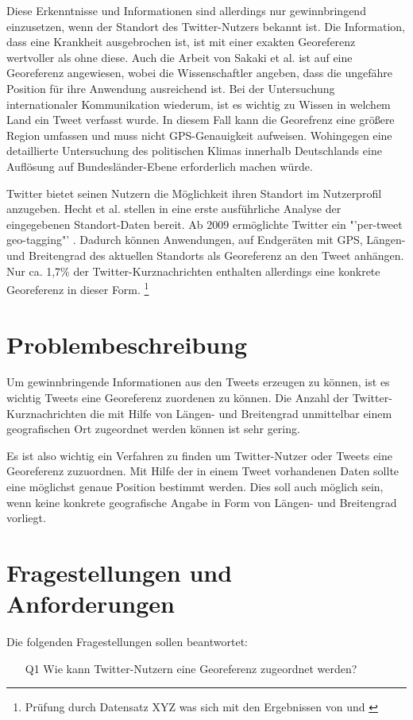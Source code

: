 		Diese Erkenntnisse und Informationen sind allerdings nur gewinnbringend einzusetzen, wenn der Standort des Twitter-Nutzers bekannt ist. 
		Die Information, dass eine Krankheit ausgebrochen ist, ist mit einer exakten Georeferenz wertvoller als ohne diese. 
		Auch die Arbeit von Sakaki et al. ist auf eine Georeferenz angewiesen, wobei die Wissenschaftler angeben, dass die ungefähre Position für ihre Anwendung ausreichend ist.
		Bei der Untersuchung internationaler Kommunikation wiederum, ist es wichtig zu Wissen in welchem Land ein Tweet verfasst wurde.
		In diesem Fall kann die Georefrenz eine größere Region umfassen und muss nicht GPS-Genauigkeit aufweisen.  
		Wohingegen eine detaillierte Untersuchung des politischen Klimas innerhalb Deutschlands eine Auflösung auf Bundesländer-Ebene erforderlich machen würde. 

 		Twitter bietet seinen Nutzern die Möglichkeit ihren Standort im Nutzerprofil anzugeben. 
 		Hecht et al. stellen in \cite{Hecht2011} eine erste ausführliche Analyse der eingegebenen Standort-Daten bereit.  
 		Ab 2009 ermöglichte Twitter ein "'per-tweet geo-tagging"' \cite{Cheng2010}.
 		Dadurch können Anwendungen, auf Endgeräten mit GPS, Längen- und Breitengrad des aktuellen Standorts als Georeferenz an den Tweet anhängen.    
		Nur ca. 1,7\% der Twitter-Kurznachrichten enthalten allerdings eine konkrete Georeferenz in dieser Form. \footnote{Prüfung durch Datensatz XYZ was sich mit den Ergebnissen von \cite{Priedhorsky2013} und \cite{Schulz2013}}


	\section{Problembeschreibung} 
		Um gewinnbringende Informationen aus den Tweets erzeugen zu können, ist es wichtig Tweets eine Georeferenz zuordenen zu können.
		Die Anzahl der Twitter-Kurznachrichten die mit Hilfe von Längen- und Breitengrad unmittelbar einem geografischen Ort zugeordnet werden können ist sehr gering. 
		
		Es ist also wichtig ein Verfahren zu finden um Twitter-Nutzer oder Tweets eine Georeferenz zuzuordnen. 
		Mit Hilfe der in einem Tweet vorhandenen Daten sollte eine möglichst genaue Position bestimmt werden. 
		Dies soll auch möglich sein, wenn keine konkrete geografische Angabe in Form von Längen- und Breitengrad vorliegt. 

	\section{Fragestellungen und Anforderungen}\label{sec:fragestellung}
		Die folgenden Fragestellungen sollen beantwortet: 
		\begin{enumerate}
			\item[Q1] Wie kann Twitter-Nutzern eine Georeferenz zugeordnet werden?
		\end{enumerate}
		  
